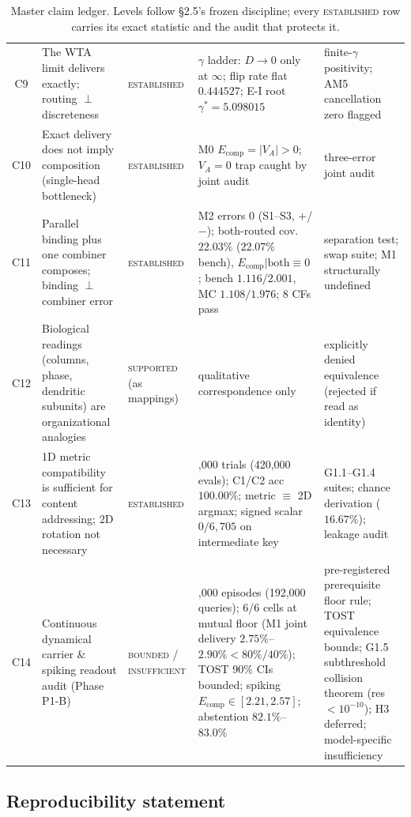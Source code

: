 \begin{table}[p]
\begin{tabular}{@{}c>{\raggedright\arraybackslash}p{3.8cm}>{\raggedright\arraybackslash}p{2.2cm}>{\raggedright\arraybackslash}p{4.6cm}>{\raggedright\arraybackslash}p{3.0cm}@{}}
C9 & The WTA limit delivers exactly; routing $\perp$ discreteness &
\textsc{established} & $\gamma$ ladder: $D\to0$ only at $\infty$; flip rate flat $0.444527$; E-I root $\gamma^*=5.098015$ & finite-$\gamma$ positivity; AM5 cancellation zero flagged \\
C10 & Exact delivery does not imply composition (single-head bottleneck) &
\textsc{established} & M0 $E_{\mathrm{comp}}=|V_A|>0$; $V_A=0$ trap caught by joint audit & three-error joint audit \\
C11 & Parallel binding plus one combiner composes; binding $\perp$ combiner error &
\textsc{established} & M2 errors $0$ (S1--S3, $+$/$-$); both-routed cov.\ $22.03\%$ ($22.07\%$ bench), $E_{\mathrm{comp}}|\text{both}\equiv0$; bench $1.116/2.001$, MC $1.108/1.976$; 8 CFs pass & separation test; swap suite; M1 structurally undefined \\
C12 & Biological readings (columns, phase, dendritic subunits) are organizational analogies &
\textsc{supported} (as mappings) & qualitative correspondence only & explicitly denied equivalence (rejected if read as identity) \\
C13 & 1D metric compatibility is sufficient for content addressing; 2D rotation not necessary &
\textsc{established} & 60,000 trials (420,000 evals); C1/C2 acc $100.00\%$; metric $\equiv$ 2D argmax; signed scalar $0/6{,}705$ on intermediate key & G1.1--G1.4 suites; chance derivation ($16.67\%$); leakage audit \\
C14 & Continuous dynamical carrier \& spiking readout audit (Phase P1-B) &
\textsc{bounded / insufficient} & 96,000 episodes (192,000 queries); 6/6 cells at mutual floor (M1 joint delivery $2.75\%$--$2.90\% < 80\%/40\%$); TOST 90\% CIs bounded; spiking $E_{\mathrm{comp}}\in[2.21, 2.57]$; abstention $82.1\%$--$83.0\%$ & pre-registered prerequisite floor rule; TOST equivalence bounds; G1.5 subthreshold collision theorem (res $<10^{-10}$); H3 deferred; model-specific insufficiency \\
\bottomrule
\end{tabular}
\caption{Master claim ledger. Levels follow \S2.5's frozen discipline; every \textsc{established} row carries its exact statistic and the audit that protects it.}
\label{tab:claims}
\end{table}
\clearpage

\subsection{Reproducibility statement}
\label{sec:repro}
\enlargethispage{3\baselineskip}

